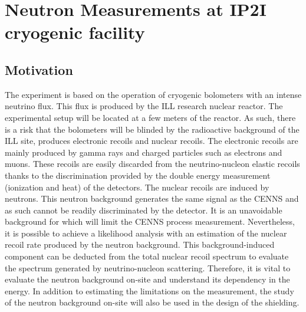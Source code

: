 
\chapter{Neutron Measurements at IP2I cryogenic facility} %

\label{ChapterNeutron} %



\section{Motivation}

The \Ricochet{} experiment is based on the operation of cryogenic bolometers with an intense neutrino flux. This flux is produced by the ILL research nuclear reactor. The \Ricochet{} experimental setup will be located at a few meters of the reactor. As such, there is a risk that the bolometers will be blinded by the radioactive background of the ILL site, produces electronic recoils and nuclear recoils. 
The electronic recoils are mainly produced by gamma rays and charged particles such as electrons and muons. These recoils are easily discarded from the neutrino-nucleon elastic recoils thanks to the discrimination provided by the double energy measurement (ionization and heat) of the detectors.
The nuclear recoils are induced by neutrons. This neutron background generates the same signal as the CENNS and as such cannot be readily discriminated by the detector. It is an unavoidable background for \Ricochet{} which will limit the CENNS process measurement.
Nevertheless, it is possible to achieve a likelihood analysis with an estimation of the nuclear recoil rate produced by the neutron background. This background-induced component can be deducted from the total nuclear recoil spectrum to evaluate the spectrum generated by neutrino-nucleon scattering. 
Therefore, it is vital to evaluate the neutron background on-site and understand its dependency in the energy.
In addition to estimating the limitations on the measurement, the study of the neutron background on-site will also be used in the design of the shielding.

